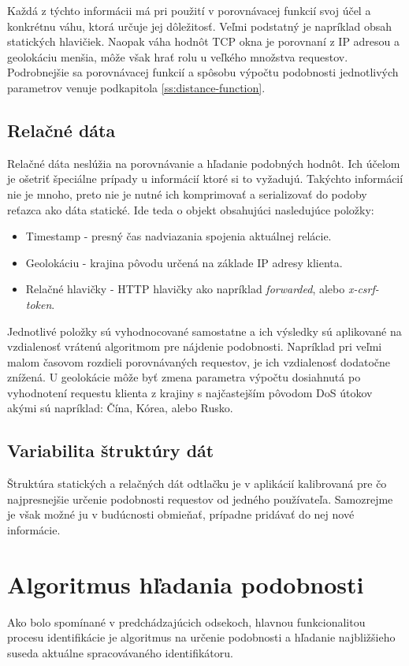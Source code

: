 \documentclass[
  digital, %
  table,   %
  lof,     %
  nolot,   %
  nocover
]{fithesis3}
\begin{document}
Každá z týchto informácii má pri použití v porovnávacej funkcií svoj účel a
konkrétnu váhu, ktorá určuje jej dôležitosť. Veľmi podstatný je napríklad obsah statických hlavičiek. Naopak
váha hodnôt TCP okna je porovnaní z IP adresou a geolokáciu menšia, môže však
hrať rolu u veľkého množstva requestov. Podrobnejšie sa porovnávacej funkcií a
spôsobu výpočtu podobnosti jednotlivých parametrov venuje podkapitola \ref{ss:distance-function}.

\subsection{Relačné dáta}
Relačné dáta neslúžia na porovnávanie a hľadanie podobných hodnôt. Ich účelom
je ošetriť špeciálne prípady u informácií ktoré si to vyžadujú. Takýchto
informácií nie je mnoho, preto nie je nutné ich komprimovať a serializovať do podoby reťazca ako
dáta statické.
Ide teda o objekt obsahujúci nasledujúce položky:
\begin{itemize}
    \item Timestamp - presný čas nadviazania spojenia aktuálnej relácie.
    \item Geolokáciu - krajina pôvodu určená na základe IP adresy klienta.
    \item Relačné hlavičky - HTTP hlavičky ako napríklad
    \textit{forwarded}, alebo \textit{x-csrf-token}. 
\end{itemize}

Jednotlivé položky sú vyhodnocované samostatne a ich výsledky sú aplikované na
vzdialenosť vrátenú algoritmom pre nájdenie podobnosti. Napríklad pri veľmi
malom časovom rozdieli porovnávaných requestov, je ich vzdialenosť dodatočne
znížená. U geolokácie môže byť zmena parametra výpočtu dosiahnutá po vyhodnotení requestu
klienta z krajiny s najčastejším pôvodom DoS útokov akými sú napríklad: Čína,
Kórea, alebo Rusko.

\subsection{Variabilita štruktúry dát}
Štruktúra statických a relačných dát odtlačku je v aplikácií kalibrovaná
pre čo najpresnejšie určenie podobnosti requestov od jedného používateľa.
Samozrejme je však možné ju v budúcnosti obmieňať, prípadne pridávať do nej
nové informácie.

\section{Algoritmus hľadania podobnosti}
\label{s:similarity-search}
Ako bolo spomínané v predchádzajúcich odsekoch, hlavnou funkcionalitou procesu identifikácie je
algoritmus na určenie podobnosti a hľadanie najbližšieho suseda aktuálne
spracovávaného identifikátoru. 
\end{document}
